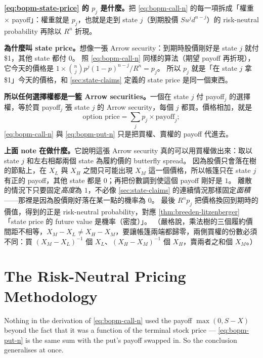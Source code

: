 \suppstart
\begin{remark}
	\textbf{\eqref{eq:bopm-state-price} 的 $p_{j}$ 是什麼。}把 \eqref{eq:bopm-call-n} 的每一項拆成「權重 $\times$ payoff」：權重就是 $p_{j}$，也就是走到 state $j$（到期股價 $Su^{j}d^{n-j}$）的 risk-neutral probability 再除以 $R^{n}$ 折現。

	\textbf{為什麼叫 state price。}想像一張 Arrow security：到期時股價剛好是 state $j$ 就付 \$1，其他 state 都付 $0$。
	照 \eqref{eq:bopm-call-n} 同樣的算法（期望 payoff 再折現），它今天的價格是 $1\times\binom{n}{j}p^{j}(1-p)^{n-j}/R^{n}=p_{j}$。
	所以 $p_{j}$ 就是「在 state $j$ 拿 \$1」今天的價格，和 \autoref{sec:state-claims} 定義的 state price 是同一個東西。

	\textbf{所以任何選擇權都是一籃 Arrow securities。}一個在 state $j$ 付 payoff$_{j}$ 的選擇權，等於買 payoff$_{j}$ 張 state $j$ 的 Arrow security，每個 $j$ 都買。價格相加，就是
	\[
		\text{option price}=\sum_{j}p_{j}\times\text{payoff}_{j} ;
	\]
	\eqref{eq:bopm-call-n} 與 \eqref{eq:bopm-put-n} 只是把買權、賣權的 payoff 代進去。

	\textbf{上面 note 在做什麼。}它說明這張 Arrow security 真的可以用買權做出來：取以 state $j$ 和左右相鄰兩個 state 為履約價的 butterfly spread。
	因為股價只會落在樹的節點上，在 $X_{L}$ 與 $X_{H}$ 之間只可能出現 $X_{M}$ 這一個價格，所以帳篷只在 state $j$ 有正的 payoff，其他 state 都是 $0$；再把份數調到使這個 payoff 剛好是 $1$。
	離散的情況下只要固定\emph{高度}為 $1$，不必像 \autoref{sec:state-claims} 的連續情況那樣固定\emph{面積}——那裡是因為股價剛好落在某一點的機率為 $0$。
	最後 $R^{n}p_{j}$ 把價格換回到期時的價值，得到的正是 risk-neutral probability，對應 \autoref{thm:breeden-litzenberger}「state price 的 future value 是機率（密度）」。
	（嚴格說，乘法樹的三個履約價間距不相等，$X_{M}-X_{L}\ne X_{H}-X_{M}$，要讓帳篷兩端都歸零，兩側買權的份數必須不同：買 $(X_{M}-X_{L})^{-1}$ 個 $X_{L}$、$(X_{H}-X_{M})^{-1}$ 個 $X_{H}$，賣兩者之和個 $X_{M}$。）
\end{remark}
\suppend

\section{The Risk-Neutral Pricing Methodology}
\label{sec:rn-methodology}


\suppstart
Nothing in the derivation of \eqref{eq:bopm-call-n} used the payoff $\max(0,S-X)$ beyond the fact that it was a function of the terminal stock price --- \eqref{eq:bopm-put-n} is the same sum with the put's payoff swapped in.
So the conclusion generalises at once.
\suppend


